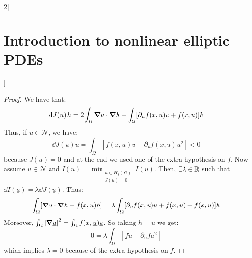 \documentclass[../../../main_math.tex]{subfiles}
\begin{document}
\begin{multicols}{2}[\section{Introduction to nonlinear elliptic PDEs}]
\begin{proposition}
  \end{proposition}
  \begin{proof}
    We have that:
    $$
      \dd{J(u)}h=2\int_\Omega \grad u\cdot \grad h-\int_\Omega [\partial_uf(x,u)u +f(x,u)]h
    $$
    Thus, if $u\in \mathcal{N}$, we have:
    $$
      \dd{J(u)}u=\int_\Omega[f(x,u)u -\partial_uf(x,u)u^2] <0
    $$
    because $J(u)=0$ and at the end we used one of the extra hypothesis on $f$. Now assume $\underline{u}\in\mathcal{N}$ and $I(\underline{u})=\displaystyle \min_{\substack{u\in H_0^1(\Omega) \\ J(u)=0}}I(u)$. Then, $\exists \lambda\in\mathbb{R}$ such that $\dd{I(\underline{u})}=\lambda \dd{J(\underline{u})}$. Thus:
    $$
      \int_\Omega [\grad \underline{u}\cdot \grad h-f(x,\underline{u})h]=\lambda \int_\Omega [\partial_uf(x,\underline{u})\underline{u}+f(x,\underline{u})-f(x,\underline{u})]h
    $$
    Moreover, $\int_\Omega \abs{\grad \underline{u}}^2=\int_\Omega f(x,\underline{u}) \underline{u}$. So taking $h=\underline{u}$ we get:
    $$
      0=\lambda \int_\Omega [f\underline{u}-\partial_uf\underline{u}^2]
    $$
    which implies $\lambda=0$ because of the extra hypothesis on $f$.
  \end{proof}

\end{multicols}
\end{document}
